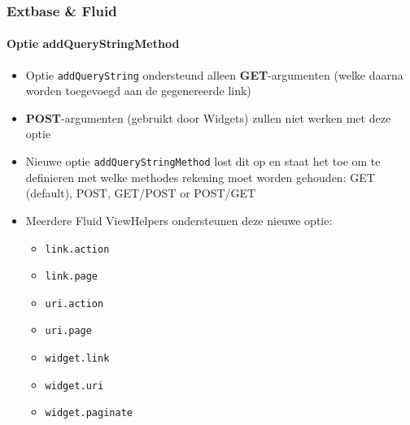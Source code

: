 \begin{frame}[fragile]
	\frametitle{Extbase \& Fluid}
	\framesubtitle{Optie addQueryStringMethod}

	\begin{itemize}
		\item Optie \texttt{addQueryString} ondersteund alleen \textbf{GET}-argumenten\newline
			\small(welke daarna worden toegevoegd aan de gegenereerde link)\normalsize
		\item \textbf{POST}-argumenten (gebruikt door Widgets) zullen niet werken met deze optie
		\item Nieuwe optie \texttt{addQueryStringMethod} lost dit op en staat het toe om te definieren met welke methodes rekening moet worden gehouden:\newline
			GET (default), POST, GET/POST or POST/GET
		\item Meerdere Fluid ViewHelpers ondersteunen deze nieuwe optie:

			\begin{itemize}\smaller
				\item \texttt{link.action}
				\item \texttt{link.page}
				\item \texttt{uri.action}
				\item \texttt{uri.page}
				\item \texttt{widget.link}
				\item \texttt{widget.uri}
				\item \texttt{widget.paginate}
			\end{itemize}

	\end{itemize}

\end{frame}


